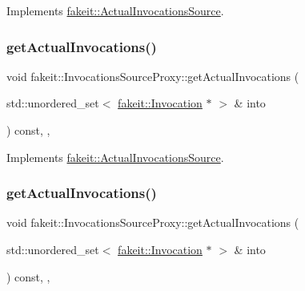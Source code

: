 Implements \mbox{\hyperlink{structfakeit_1_1ActualInvocationsSource_a274de522e11e1f9b8d70c6e0be9e5a9b}{fakeit\+::\+Actual\+Invocations\+Source}}.

\mbox{\label{structfakeit_1_1InvocationsSourceProxy_af06b5d62b0c4ff1e3048fae5d7ddd8c3}} 
\subsubsection{\texorpdfstring{getActualInvocations()}{getActualInvocations()}\hspace{0.1cm}{\footnotesize\ttfamily [5/9]}}
{\footnotesize\ttfamily void fakeit\+::\+Invocations\+Source\+Proxy\+::get\+Actual\+Invocations (\begin{DoxyParamCaption}\item[{std\+::unordered\+\_\+set$<$ \mbox{\hyperlink{structfakeit_1_1Invocation}{fakeit\+::\+Invocation}} $\ast$ $>$ \&}]{into }\end{DoxyParamCaption}) const\hspace{0.3cm}{\ttfamily [inline]}, {\ttfamily [override]}, {\ttfamily [virtual]}}



Implements \mbox{\hyperlink{structfakeit_1_1ActualInvocationsSource_a274de522e11e1f9b8d70c6e0be9e5a9b}{fakeit\+::\+Actual\+Invocations\+Source}}.

\mbox{\label{structfakeit_1_1InvocationsSourceProxy_af06b5d62b0c4ff1e3048fae5d7ddd8c3}} 
\subsubsection{\texorpdfstring{getActualInvocations()}{getActualInvocations()}\hspace{0.1cm}{\footnotesize\ttfamily [6/9]}}
{\footnotesize\ttfamily void fakeit\+::\+Invocations\+Source\+Proxy\+::get\+Actual\+Invocations (\begin{DoxyParamCaption}\item[{std\+::unordered\+\_\+set$<$ \mbox{\hyperlink{structfakeit_1_1Invocation}{fakeit\+::\+Invocation}} $\ast$ $>$ \&}]{into }\end{DoxyParamCaption}) const\hspace{0.3cm}{\ttfamily [inline]}, {\ttfamily [override]}, {\ttfamily [virtual]}}



